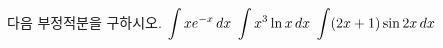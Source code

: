 다음 부정적분을 구하시오.
 $\displaystyle\int xe^{-x}\mkern3mu dx$
 $\displaystyle\int x^3\ln x\mkern3mu dx$
 $\displaystyle\int (2x+1)\sin 2x\mkern3mu dx$
